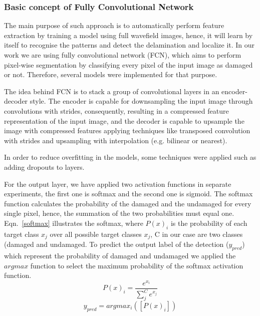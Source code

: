 	\subsubsection{Basic concept of Fully Convolutional Network}
	The main purpose of such approach is to automatically perform feature extraction by training a model using full wavefield images, hence, it will learn by itself to recognise the patterns and detect the delamination and localize it.
	In our work we are using fully convolutional network (FCN), which aims to perform pixel-wise segmentation by classifying every pixel of the input image as damaged or not. 
	Therefore, several models were implemented for that purpose.

	The idea behind FCN is to stack a group of convolutional layers in an encoder-decoder style. 
	The encoder is capable for downsampling the input image through convolutions with strides, consequently, resulting in a compressed feature representation of the input image, and the decoder is capable to upsample the image with compressed features applying techniques like transposed convolution with strides and upsampling with interpolation (e.g. bilinear or nearest).


	In order to reduce overfitting in the models, some techniques were applied such as adding dropouts to layers.

	For the output layer, we have applied two activation functions in separate experiments, the first one is softmax and the second one is sigmoid. 
	The softmax function calculates the probability of the damaged and the undamaged for every single pixel, hence, the summation of the two probabilities must equal one. Eqn.~\ref{softmax} illustrates the softmax, where \(P(x)_{i}\) is the probability of each target class \(x_{j}\) over all possible target classes \(x_{j}\), C in our case are two classes  (damaged and undamaged.
	To predict the output label of the detection (\(y_{pred}\)) which represent the probability of damaged and undamaged we applied the \(argmax\) function to select the maximum probability of the softmax activation function.
	\begin{equation}
		P(x)_{i} = \frac{e^{x_{i}}}{\sum_{j}^{C} e^{x_{j}}}
		\label{softmax}
	\end{equation} 
	\begin{equation}
		y_{pred} = argmax_{i}\left( \left[P(x)_{i}\right]\right)
		\label{argmax}
	\end{equation}

